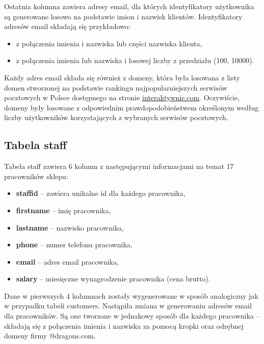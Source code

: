 \documentclass{article}
\begin{document}
		Ostatnia kolumna zawiera adresy email, dla których identyfikatory użytkownika są generowane losowo na podstawie imion i nazwisk klientów. Identyfikatory adresów email składają się przykładowo:
		\begin{itemize}
			\setlength{\itemsep}{-2pt}
			\item z połączenia imienia i nazwiska lub części nazwiska klienta,
			\item z połączenia imienia lub nazwiska i losowej liczby z przedziału (100, 10000).
		\end{itemize}
	
		Każdy adres email składa się również z domeny, która była losowana z listy domen stworzonej na podstawie rankingu najpopularniejszych serwisów pocztowych w Polsce dostępnego na stronie \href{https://interaktywnie.com/biznes/artykuly/biznes/przeglad-ktora-poczta-e-mail-jest-najlepsza-16950}{interaktywnie.com}. Oczywiście, domeny były losowane z odpowiednim prawdopodobieństwem określonym według  liczby użytkowników korzystających z wybranych serwisów pocztowych.
		
	\subsection{Tabela staff}
		Tabela staff zawiera 6 kolumn z następującymi informacjami na temat 17 pracowników sklepu:
		\begin{itemize}
			\setlength{\itemsep}{-2pt}
			\item \textbf{staff\textunderscore id} – zawiera unikalne id dla każdego pracownika,
			\item \textbf{first\textunderscore name} – imię pracownika,
			\item \textbf{last\textunderscore name} – nazwisko pracownika,
			\item \textbf{phone} – numer telefonu pracownika,
			\item \textbf{email} – adres email pracownika,
			\item \textbf{salary} – miesięczne wynagrodzenie pracownika (cena brutto).
		\end{itemize}
	
		Dane w pierwszych 4 kolumnach zostały wygenerowane w sposób analogiczny jak w przypadku tabeli customers. Nastąpiła zmiana w generowaniu adresów email dla pracowników. Są one tworzone w jednakowy sposób dla każdego pracownika – składają się z połączenia imienia i nazwiska za pomocą kropki oraz odrębnej domeny firmy @dragons.com.\\
		
\end{document}
